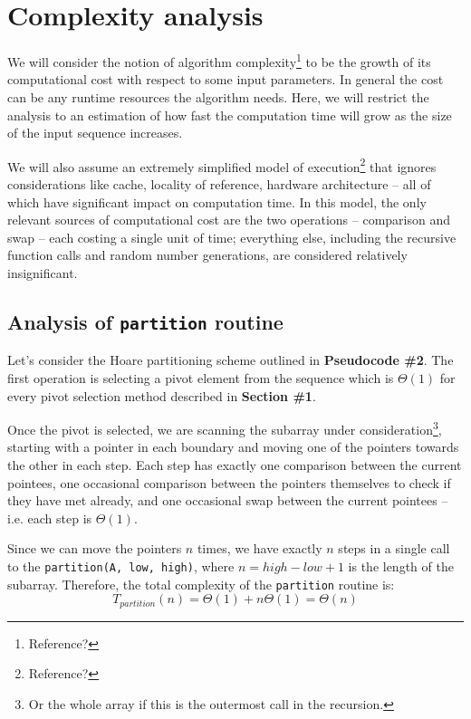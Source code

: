 \documentclass[]{finalproject}
\begin{document}
\section{Complexity analysis}

We will consider the notion of algorithm complexity\footnote{Reference?} to be the growth of its computational cost with respect to some input parameters. In general the cost can be any runtime resources the algorithm needs. Here, we will restrict the analysis to an estimation of how fast the computation time will grow as the size of the input sequence increases.

We will also assume an extremely simplified model of execution\footnote{Reference?} that ignores considerations like cache, locality of reference, hardware architecture -- all of which have significant impact on computation time. In this model, the only relevant sources of computational cost are the two operations -- comparison and swap -- each costing a single unit of time; everything else, including the recursive function calls and random number generations, are considered relatively insignificant.

\subsection{Analysis of \texttt{partition} routine}

Let's consider the Hoare partitioning scheme outlined in \textbf{Pseudocode \#2}. The first operation is selecting a pivot element from the sequence which is $\Theta(1)$ for every pivot selection method described in \textbf{Section \#1}.

Once the pivot is selected, we  are scanning the subarray under consideration\footnote{Or the whole array if this is the outermost call in the recursion.}, starting with a pointer in each boundary and moving one of the pointers towards the other in each step. Each step has exactly one comparison between the current pointees, one occasional comparison between the pointers themselves to check if they have met already, and one occasional swap between the current pointees -- i.e. each step is $\Theta(1)$.

Since we can move the pointers $n$ times, we have exactly $n$ steps in a single call to the \texttt{partition(A, low, high)}, where $n = high - low + 1$ is the length of the subarray. Therefore, the total complexity of the \texttt{partition} routine is: $$T_{partition}(n) = \Theta(1) + n\Theta(1) = \Theta(n)$$
\end{document}

